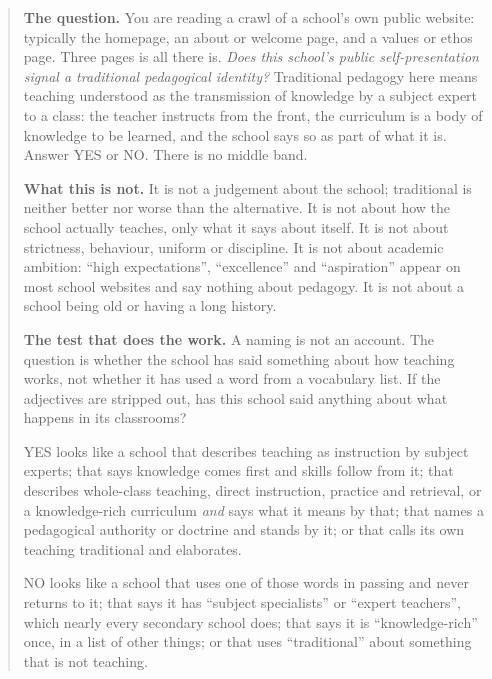 
\begin{quote}
\footnotesize

\textbf{The question.} You are reading a crawl of a school's own public
website: typically the homepage, an about or welcome page, and a values or
ethos page. Three pages is all there is. \emph{Does this school's public
self-presentation signal a traditional pedagogical identity?} Traditional
pedagogy here means teaching understood as the transmission of knowledge by a
subject expert to a class: the teacher instructs from the front, the
curriculum is a body of knowledge to be learned, and the school says so as
part of what it is. Answer YES or NO. There is no middle band.

\textbf{What this is not.} It is not a judgement about the school; traditional
is neither better nor worse than the alternative. It is not about how the
school actually teaches, only what it says about itself. It is not about
strictness, behaviour, uniform or discipline. It is not about academic
ambition: ``high expectations'', ``excellence'' and ``aspiration'' appear on
most school websites and say nothing about pedagogy. It is not about a school
being old or having a long history.

\textbf{The test that does the work.} A naming is not an account. The question
is whether the school has said something about how teaching works, not whether
it has used a word from a vocabulary list. If the adjectives are stripped out,
has this school said anything about what happens in its classrooms?

YES looks like a school that describes teaching as instruction by subject
experts; that says knowledge comes first and skills follow from it; that
describes whole-class teaching, direct instruction, practice and retrieval, or
a knowledge-rich curriculum \emph{and} says what it means by that; that names a
pedagogical authority or doctrine and stands by it; or that calls its own
teaching traditional and elaborates.

NO looks like a school that uses one of those words in passing and never
returns to it; that says it has ``subject specialists'' or ``expert teachers'',
which nearly every secondary school does; that says it is ``knowledge-rich''
once, in a list of other things; or that uses ``traditional'' about something
that is not teaching.


\end{quote}
